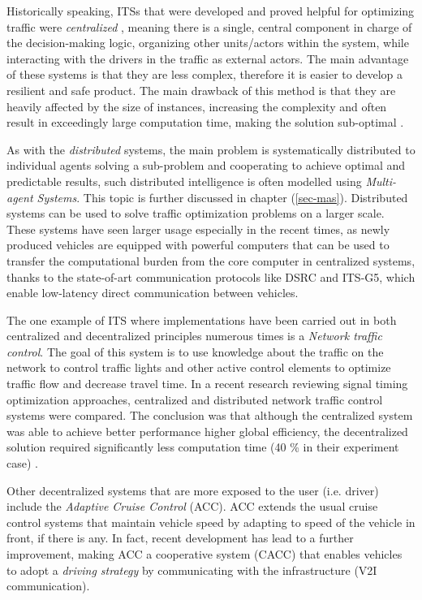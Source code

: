 \documentclass[main.tex]{subfiles}
\begin{document}
Historically speaking, ITSs that were
developed and proved helpful for optimizing traffic were \emph{centralized} \cite{Corman2010}, meaning there is a
single, central component in charge of the decision-making logic, organizing other units/actors within the
system, while interacting with the drivers in the traffic as external actors. The main
advantage of these systems is that they are less complex, therefore it is easier to develop a resilient and
safe product. The main drawback of this method is that they are heavily affected by the size
of instances, increasing the complexity and often result in exceedingly large computation time,
making the solution sub-optimal \cite{Corman2010}. 

As with the \emph{distributed} systems, the main problem is systematically distributed to
individual agents solving a sub-problem and cooperating to achieve optimal and predictable
results, such distributed intelligence is often modelled using \emph{Multi-agent Systems}. 
This topic is further discussed in chapter (\ref{sec-mas}). Distributed systems can be used to
solve traffic optimization problems on a larger scale. These systems have seen larger usage
especially in the recent times, as newly produced vehicles are equipped with powerful computers
that can be used to transfer the computational burden from the core computer in centralized
systems, thanks to the state-of-art communication protocols like DSRC and ITS-G5, which enable
low-latency direct communication between vehicles. 

The one example of ITS where implementations have been carried out in both centralized and 
decentralized principles numerous times is a \emph{Network traffic control}. The goal of this 
system is to use knowledge about the traffic on the network to control traffic lights and other 
active control elements to optimize traffic flow and decrease travel time. In a recent research 
reviewing signal timing optimization approaches, centralized and distributed network traffic
control systems were compared. The conclusion was that although the centralized system was able
to achieve better performance higher global efficiency, the decentralized solution required
significantly less computation time (40 \% in their experiment case) \cite{Chow2019}.

Other decentralized systems that are more exposed to the user (i.e. driver) include the 
\emph{Adaptive Cruise Control} (ACC). ACC extends the usual cruise control systems 
that maintain vehicle speed by adapting to speed of the vehicle in front, if there is any. In fact, 
recent development has lead to a further improvement, making ACC a cooperative system (CACC) that 
enables vehicles to adopt a \emph{driving strategy} by communicating with the infrastructure (V2I 
communication).
\end{document}
